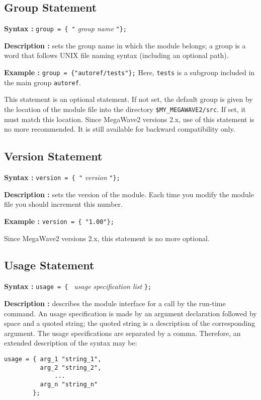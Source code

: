 \subsection{Group Statement}

{\bf Syntax :} \verb+group = { "+ {\em group name} \verb+"};+

{\bf Description :} sets the group name in which the module belongs; 
a group is a word that follows UNIX file naming syntax (including an
optional path).

{\bf Example :} \verb+group = {"autoref/tests"};+
Here, \verb+tests+ is a subgroup included in the main group \verb+autoref+.

This statement is an optional statement.
If not set, the default group is given by the location of the module file
into the directory \verb+$MY_MEGAWAVE2/src+.
If set, it must match this location.
Since MegaWave2 versions 2.x, use of this statement is no more recommended.
It is still available for backward compatibility only.

\subsection{Version Statement}

{\bf Syntax :} \verb+version = { "+ {\em version } \verb+"};+

{\bf Description :} sets the version of the module.
Each time you modify the module file you should increment this number.

{\bf Example :} \verb+version = { "1.00"};+

Since MegaWave2 versions 2.x, this statement is no more optional.

\subsection{Usage Statement}

{\bf Syntax :} \verb+usage = { + {\em usage specification list} \verb+};+

{\bf Description :} describes the module interface for a call by the run-time command.
An usage specification is made by an argument declaration followed by space and a quoted string; 
the quoted string is a description of the corresponding argument.
The usage specifications are separated by a comma.
Therefore, an extended description of the syntax may be:
\begin{verbatim}
usage = { arg_1 "string_1",
          arg_2 "string_2",
              ...
          arg_n "string_n"
        };
\end{verbatim}

